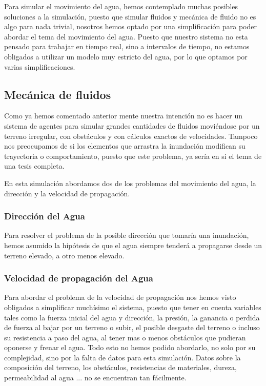 Para simular el movimiento del agua, hemos contemplado muchas posibles soluciones a la simulación, puesto que simular fluidos y mecánica de fluido no es algo para nada trivial, nosotros hemos optado por una simplificación para poder abordar el tema del movimiento del agua. Puesto que nuestro sistema no esta pensado para trabajar en tiempo real, sino a intervalos de tiempo, no estamos obligados a utilizar un modelo muy estricto del agua, por lo que optamos por varias simplificaciones.

\subsection*{Mecánica de fluidos}
Como ya hemos comentado anterior mente nuestra intención no es hacer un sistema de agentes para simular grandes cantidades de fluidos moviéndose por un terreno irregular, con obstáculos y con cálculos exactos de velocidades. Tampoco nos preocupamos de si los elementos que arrastra la inundación modifican su trayectoria o comportamiento, puesto que este problema, ya sería en si el tema de una tesis completa.

En esta simulación abordamos dos de los problemas del movimiento del agua, la dirección y la velocidad de propagación.

\subsubsection*{Dirección del Agua}

Para resolver el problema de la posible dirección que tomaría una inundación, hemos asumido la hipótesis de que el agua siempre tenderá a propagarse desde un terreno elevado, a otro menos elevado.

\subsubsection*{Velocidad de propagación del Agua}
Para abordar el problema de la velocidad de propagación nos hemos visto obligados a simplificar muchísimo el sistema, puesto que tener en cuenta variables tales como la fuerza inicial del agua y dirección, la presión, la ganancia o perdida de fuerza al bajar por un terreno o subir, el posible desgaste del terreno o incluso su resistencia a paso del agua, al tener mas o menos obstáculos que pudieran oponerse y frenar el agua. Todo esto no hemos podido abordarlo, no solo por su complejidad, sino por la falta de datos para esta simulación. Datos sobre la composición del terreno, los obstáculos, resistencias de materiales, dureza, permeabilidad al agua ... no se encuentran tan fácilmente.

